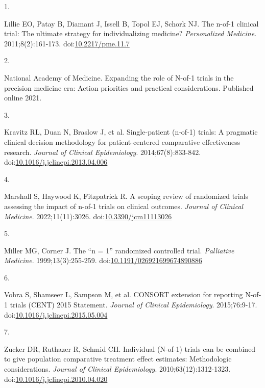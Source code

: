 \documentclass[
  11pt,
]{article}
\newlength{\cslhangindent}
\newlength{\csllabelwidth}
\newenvironment{CSLReferences}[2] %
 {\begin{list}{}{%
  \setlength{\itemindent}{0pt}
  \setlength{\leftmargin}{0pt}
  \setlength{\parsep}{0pt}
  \ifodd #1
   \setlength{\leftmargin}{\cslhangindent}
   \setlength{\itemindent}{-1\cslhangindent}
  \fi
  \setlength{\itemsep}{#2\baselineskip}}}
 {\end{list}}
\newcommand{\CSLLeftMargin}[1]{\parbox[t]{\csllabelwidth}{\strut#1\strut}}
\newcommand{\CSLRightInline}[1]{\parbox[t]{\linewidth - \csllabelwidth}{\strut#1\strut}}
\begin{document}
\protect{}\label{refs}
\begin{CSLReferences}{0}{1}
\CSLLeftMargin{1. }%
\CSLRightInline{Lillie EO, Patay B, Diamant J, Issell B, Topol EJ,
Schork NJ. The n-of-1 clinical trial: The ultimate strategy for
individualizing medicine? \emph{Personalized Medicine}.
2011;8(2):161-173.
doi:\href{https://doi.org/10.2217/pme.11.7}{10.2217/pme.11.7}}

\CSLLeftMargin{2. }%
\CSLRightInline{National Academy of Medicine. Expanding the role of
{N-of-1} trials in the precision medicine era: {Action} priorities and
practical considerations. Published online 2021.}

\CSLLeftMargin{3. }%
\CSLRightInline{{Kravitz RL, Duan N, Braslow J, et al.} Single-patient
(n-of-1) trials: A pragmatic clinical decision methodology for
patient-centered comparative effectiveness research. \emph{Journal of
Clinical Epidemiology}. 2014;67(8):833-842.
doi:\href{https://doi.org/10.1016/j.jclinepi.2013.04.006}{10.1016/j.jclinepi.2013.04.006}}

\CSLLeftMargin{4. }%
\CSLRightInline{Marshall S, Haywood K, Fitzpatrick R. A scoping review
of randomized trials assessing the impact of n-of-1 trials on clinical
outcomes. \emph{Journal of Clinical Medicine}. 2022;11(11):3026.
doi:\href{https://doi.org/10.3390/jcm11113026}{10.3390/jcm11113026}}

\CSLLeftMargin{5. }%
\CSLRightInline{Miller MG, Corner J. The {``n = 1''} randomized
controlled trial. \emph{Palliative Medicine}. 1999;13(3):255-259.
doi:\href{https://doi.org/10.1191/026921699674890886}{10.1191/026921699674890886}}

\CSLLeftMargin{6. }%
\CSLRightInline{{Vohra S, Shamseer L, Sampson M, et al.} {CONSORT}
extension for reporting {N-of-1} trials ({CENT}) 2015 {Statement}.
\emph{Journal of Clinical Epidemiology}. 2015;76:9-17.
doi:\href{https://doi.org/10.1016/j.jclinepi.2015.05.004}{10.1016/j.jclinepi.2015.05.004}}

\CSLLeftMargin{7. }%
\CSLRightInline{Zucker DR, Ruthazer R, Schmid CH. Individual ({N-of-1})
trials can be combined to give population comparative treatment effect
estimates: Methodologic considerations. \emph{Journal of Clinical
Epidemiology}. 2010;63(12):1312-1323.
doi:\href{https://doi.org/10.1016/j.jclinepi.2010.04.020}{10.1016/j.jclinepi.2010.04.020}}


\end{CSLReferences}
\end{document}
